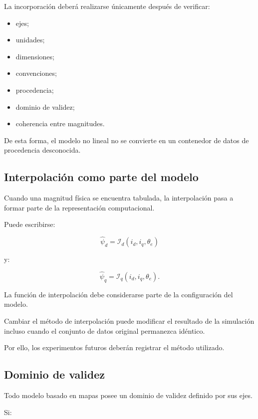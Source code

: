 La incorporación deberá realizarse únicamente después de verificar:

\begin{itemize}
\item ejes;
\item unidades;
\item dimensiones;
\item convenciones;
\item procedencia;
\item dominio de validez;
\item coherencia entre magnitudes.
\end{itemize}

De esta forma, el modelo no lineal no se convierte en un contenedor de datos de procedencia desconocida.

\subsection{Interpolación como parte del modelo}

Cuando una magnitud física se encuentra tabulada, la interpolación pasa a formar parte de la representación computacional.

Puede escribirse:

\begin{equation}
\hat{\psi}_d
=
\mathcal{I}_d
\left(
i_d,i_q,\theta_e
\right)
\end{equation}

y:

\begin{equation}
\hat{\psi}_q
=
\mathcal{I}_q
\left(
i_d,i_q,\theta_e
\right).
\end{equation}

La función de interpolación debe considerarse parte de la configuración del modelo.

Cambiar el método de interpolación puede modificar el resultado de la simulación incluso cuando el conjunto de datos original permanezca idéntico.

Por ello, los experimentos futuros deberán registrar el método utilizado.

\subsection{Dominio de validez}

Todo modelo basado en mapas posee un dominio de validez definido por sus ejes.

Si:


